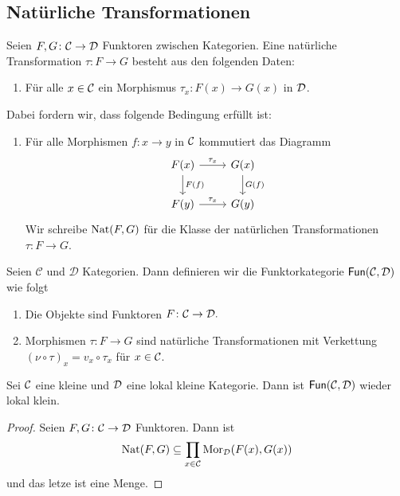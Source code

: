 \subsection{Natürliche Transformationen}
\begin{Def}
    Seien $F,G\colon\mathcal{C}\to\mathcal{D}$ Funktoren zwischen Kategorien. Eine natürliche Transformation $\tau\colon F\to G$ besteht aus den folgenden Daten:
    \begin{enumerate}
        \item Für alle $x\in\mathcal{C}$ ein Morphismus $\tau_x\colon F(x)\to G(x)$ in $\mathcal{D}$.
    \end{enumerate}
\end{Def}
Dabei fordern wir, dass folgende Bedingung erfüllt ist:
\begin{enumerate}
    \item Für alle Morphismen $f\colon x\to y$ in $\mathcal{C}$ kommutiert das Diagramm $$%
\begin{tikzcd}
F(x) \arrow[r, "\tau_x"] \arrow[d, "F(f)"] & G(x) \arrow[d, "G(f)"] \\
F(y) \arrow[r, "\tau_x"]                   & G(y)                  
\end{tikzcd}$$ Wir schreibe $\operatorname{Nat}(F,G)$ für die Klasse der natürlichen Transformationen $\tau\colon F\to G$.
\end{enumerate}
\begin{Def}[Funktorkategorie]
    Seien $\mathcal{C}$ und $\mathcal{D}$ Kategorien. Dann definieren wir die Funktorkategorie $\mathsf{Fun}(\mathcal{C},\mathcal{D})$ wie folgt
    \begin{enumerate}
        \item Die Objekte sind Funktoren $F\colon \mathcal{C}\to\mathcal{D}.$
        \item Morphismen $\tau\colon F\to G$ sind natürliche Transformationen  mit Verkettung $(\nu\circ \tau)_x=v_x\circ\tau_x$ für $x\in\mathcal{C}$.
    \end{enumerate}
\end{Def}
\begin{Lemma}
    Sei $\mathcal{C}$ eine kleine und $\mathcal{D}$ eine lokal kleine Kategorie. Dann ist $\mathsf{Fun}(\mathcal{C},\mathcal{D})$ wieder lokal klein.
\end{Lemma}
\begin{proof}
    Seien $F,G\colon\mathcal{C}\to\mathcal{D}$ Funktoren. Dann ist 
    $$\operatorname{Nat}(F,G)\subseteq \prod_{x\in\mathcal{C}}\operatorname{Mor}_{\mathcal{D}}(F(x),G(x))$$ und das letze ist eine Menge.
\end{proof}
